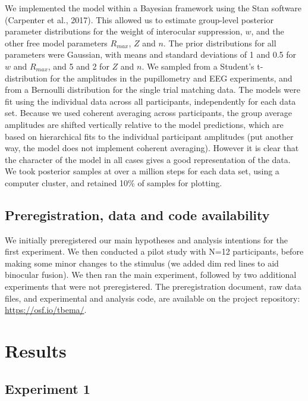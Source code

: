 \documentclass[
]{article}
\begin{document}
We implemented the model within a Bayesian framework using the Stan software (Carpenter et al., 2017). This allowed us to estimate group-level posterior parameter distributions for the weight of interocular suppression, \(w\), and the other free model parameters \(R_{max}\), \(Z\) and \(n\). The prior distributions for all parameters were Gaussian, with means and standard deviations of 1 and 0.5 for \(w\) and \(R_{max}\), and 5 and 2 for \(Z\) and \(n\). We sampled from a Student's t-distribution for the amplitudes in the pupillometry and EEG experiments, and from a Bernoulli distribution for the single trial matching data. The models were fit using the individual data across all participants, independently for each data set. Because we used coherent averaging across participants, the group average amplitudes are shifted vertically relative to the model predictions, which are based on hierarchical fits to the individual participant amplitudes (put another way, the model does not implement coherent averaging). However it is clear that the character of the model in all cases gives a good representation of the data. We took posterior samples at over a million steps for each data set, using a computer cluster, and retained 10\% of samples for plotting.

\hypertarget{preregistration-data-and-code-availability}{%
\subsection{Preregistration, data and code availability}\label{preregistration-data-and-code-availability}}

We initially preregistered our main hypotheses and analysis intentions for the first experiment. We then conducted a pilot study with N=12 participants, before making some minor changes to the stimulus (we added dim red lines to aid binocular fusion). We then ran the main experiment, followed by two additional experiments that were not preregistered. The preregistration document, raw data files, and experimental and analysis code, are available on the project repository: \url{https://osf.io/tbema/}.

\hypertarget{results}{%
\section{Results}\label{results}}

\hypertarget{experiment-1}{%
\subsection{Experiment 1}\label{experiment-1}}
\end{document}
